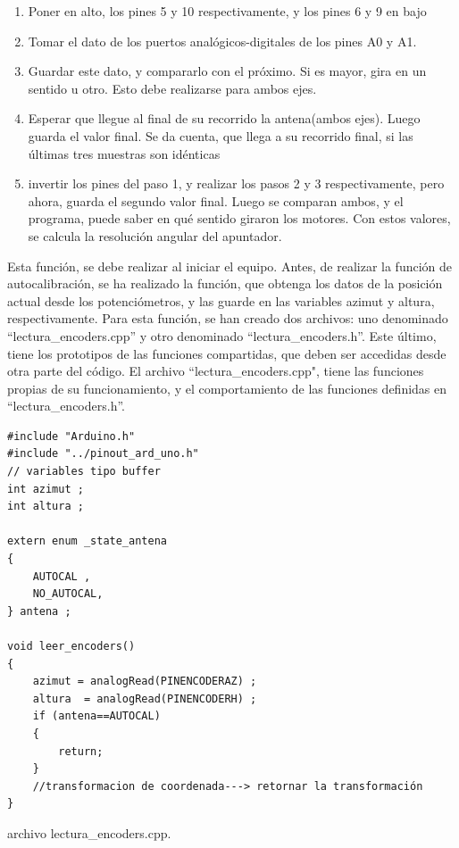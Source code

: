 \begin{enumerate}
	\item Poner en alto, los pines 5 y 10 respectivamente, y los pines 6 y 9 en bajo  
	\item Tomar el dato de los puertos analógicos-digitales de los pines A0 y A1. 
	\item Guardar este dato, y compararlo con el próximo. Si es mayor, gira en un sentido u otro. Esto debe realizarse para ambos ejes. 
	\item Esperar que llegue al final de su recorrido la antena(ambos ejes). Luego guarda el valor final. Se da cuenta, que llega a su recorrido final, si las últimas tres muestras son idénticas
   \item invertir los pines del paso 1, y realizar los pasos 2 y 3 respectivamente, pero ahora, guarda el segundo valor final. Luego se comparan ambos, y el programa, puede saber en qué sentido giraron los motores. Con estos valores, se calcula la resolución angular del apuntador. 
\end{enumerate}

Esta función, se debe realizar al iniciar el equipo.  
Antes, de realizar la función de autocalibración, se ha realizado la función, que obtenga los datos de la posición actual desde los potenciómetros, y las guarde en las variables azimut y altura, respectivamente. Para esta función, se han creado dos archivos: uno denominado ``lectura\_encoders.cpp'' y otro denominado ``lectura\_encoders.h''. Este último, tiene los prototipos de las funciones compartidas, que deben ser accedidas desde otra parte del código. El archivo ``lectura\_encoders.cpp", tiene las funciones propias de su funcionamiento, y el comportamiento de las funciones definidas en ``lectura\_encoders.h''.  
\begin{listing}[ht]
	\begin{verbatim}
#include "Arduino.h" 
#include "../pinout_ard_uno.h"
// variables tipo buffer 
int azimut ; 
int altura ;

extern enum _state_antena 
{
	AUTOCAL ,  
	NO_AUTOCAL, 
} antena ;

void leer_encoders()
{
	azimut = analogRead(PINENCODERAZ) ; 
	altura  = analogRead(PINENCODERH) ; 
	if (antena==AUTOCAL) 
	{
		return;
	}
	//transformacion de coordenada---> retornar la transformación
}

	\end{verbatim}
\caption{archivo lectura\_encoders.cpp. }
\label{cod:lectura_encoders.cpp}
\end{listing}

